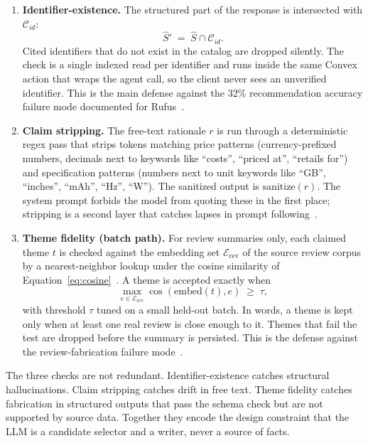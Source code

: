 \begin{enumerate}
  \item \textbf{Identifier-existence.} The structured part of the
    response is intersected with $\mathcal{C}_{id}$:
    \begin{equation}
      \hat{S}' \;=\; \hat{S} \cap \mathcal{C}_{id}.
      \label{eq:id-existence}
    \end{equation}
    Cited identifiers that do not exist in the catalog are dropped
    silently. The check is a single indexed read per identifier and
    runs inside the same Convex action that wraps the agent call,
    so the client never sees an unverified identifier. This is the
    main defense against the 32\% recommendation accuracy
    failure mode documented for
    Rufus~\cite{RufusWrong2024}.
  \item \textbf{Claim stripping.} The free-text rationale $r$ is
    run through a deterministic regex pass that strips tokens
    matching price patterns (currency-prefixed numbers, decimals
    next to keywords like ``costs'', ``priced at'', ``retails
    for'') and specification patterns (numbers next to unit
    keywords like ``GB'', ``inches'', ``mAh'', ``Hz'', ``W'').
    The sanitized output is $\mathrm{sanitize}(r)$. The system
    prompt forbids the model from quoting these in the first
    place; stripping is a second layer that catches lapses in
    prompt following~\cite{ShopifyAgentic}.
  \item \textbf{Theme fidelity (batch path).} For review summaries
    only, each claimed theme $t$ is checked against the embedding
    set $\mathcal{E}_{\mathrm{rev}}$ of the source review corpus by
    a nearest-neighbor lookup under the cosine similarity of
    Equation~\ref{eq:cosine}~\cite{ManningIR2008}. A theme is
    accepted exactly when
    \begin{equation}
      \max_{e \in \mathcal{E}_{\mathrm{rev}}} \cos(\mathrm{embed}(t), e)
      \;\geq\; \tau,
      \label{eq:theme-fidelity}
    \end{equation}
    with threshold $\tau$ tuned on a small held-out batch. In
    words, a theme is kept only when at least one real review is
    close enough to it. Themes
    that fail the test are dropped before the summary is
    persisted. This is the defense against the review-fabrication
    failure mode~\cite{RufusConfidentlyWrong2024}.
\end{enumerate}

The three checks are not redundant. Identifier-existence catches
structural hallucinations. Claim stripping catches drift in free
text. Theme fidelity catches fabrication in structured outputs
that pass the schema check but are not supported by source data.
Together they encode the design constraint that the LLM is a
candidate selector and a writer, never a source of facts.

